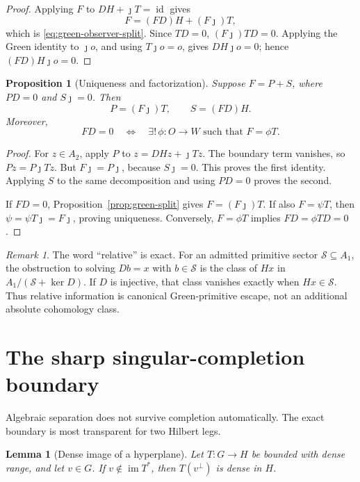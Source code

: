 \documentclass[11pt]{article}
\newtheorem{proposition}[theorem]{Proposition}
\newtheorem{lemma}[theorem]{Lemma}
\theoremstyle{definition}
\theoremstyle{remark}
\newtheorem{remark}[theorem]{Remark}
\newcommand{\cS}{\mathcal S}
\newcommand{\id}{\operatorname{id}}
\newcommand{\im}{\operatorname{im}}
\begin{document}
\begin{proof}
Applying \(F\) to \(DH+\jmath T=\id\) gives
\[
                     F=(FD)H+(F\jmath)T,
\]
which is \eqref{eq:green-observer-split}.  Since \(TD=0\),
\((F\jmath)TD=0\).  Applying the Green identity to \(\jmath o\), and using
\(T\jmath o=o\), gives \(DH\jmath o=0\); hence \((FD)H\jmath o=0\).
\end{proof}

\begin{proposition}[Uniqueness and factorization]
\label{prop:green-unique}
Suppose \(F=P+S\), where \(PD=0\) and \(S\jmath=0\).  Then
\[
                 P=(F\jmath)T,\qquad S=(FD)H.
\tag{3.2}\label{eq:unique-parts}
\]
Moreover,
\[
 FD=0
 \quad\Longleftrightarrow\quad
 \exists!\,\phi:O\to W\text{ such that }F=\phi T.
\tag{3.3}\label{eq:trace-universal}
\]
\end{proposition}

\begin{proof}
For \(z\in A_2\), apply \(P\) to
\(z=DH z+\jmath Tz\).  The boundary term vanishes, so
\(Pz=P\jmath Tz\).  But \(F\jmath=P\jmath\), because \(S\jmath=0\).
This proves the first identity.  Applying \(S\) to the same decomposition
and using \(PD=0\) proves the second.

If \(FD=0\), Proposition~\ref{prop:green-split} gives
\(F=(F\jmath)T\).  If also \(F=\psi T\), then
\(\psi=\psi T\jmath=F\jmath\), proving uniqueness.  Conversely,
\(F=\phi T\) implies \(FD=\phi TD=0\).
\end{proof}

\begin{remark}
The word ``relative'' is exact.  For an admitted primitive sector
\(\cS\subseteq A_1\), the obstruction to solving \(Db=x\) with
\(b\in\cS\) is the class of \(Hx\) in
\(A_1/(\cS+\ker D)\).  If \(D\) is injective, that class vanishes exactly
when \(Hx\in\cS\).  Thus relative information is canonical Green-primitive
escape, not an additional absolute cohomology class.
\end{remark}

\section{The sharp singular-completion boundary}
\label{sec:singular}

Algebraic separation does not survive completion automatically.  The exact
boundary is most transparent for two Hilbert legs.

\begin{lemma}[Dense image of a hyperplane]
\label{lem:dense-hyperplane}
Let \(T:G\to H\) be bounded with dense range, and let \(v\in G\).  If
\(v\notin\im T^*\), then \(T(v^\perp)\) is dense in \(H\).
\end{lemma}
\end{document}
